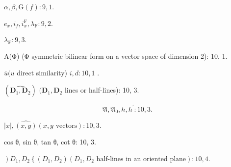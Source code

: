 \(\alpha, \beta, \mathrm{G}(f): 9, 1.\)

\(e_x, i_f, i_x^{\mathrm{F}}, \lambda_{\mathrm{F}}: 9, 2.\)

\(\lambda_{\mathbf{F}}:9,3.\)

A(Φ) (Φ symmetric bilinear form on a vector space of dimension 2): 10, 1.

\(\overline{u} (u\) direct similarity) \(i,d:10,1\) .

\((\widehat{\mathbf{D}_1,\mathbf{D}_2})\) \((\mathbf{D}_1,\mathbf{D}_2\) lines or half-lines): 10, 3.

\[
\mathfrak {A}, \mathfrak {A} _ {0}, h, h ^ {\prime}: 1 0, 3.
\]

\(|x|, \widehat{(x,y)}(x,y\text{ vectors}):10,3.\)

cos θ, sin θ, tan θ, cot θ: 10, 3.

\(\left.\right)D_{1}, D_{2}\left\{\left(D_{1}, D_{2}\right)\left(D_{1}, D_{2} \text{ half-lines in an oriented plane}\right): 10, 4.\right.\)


